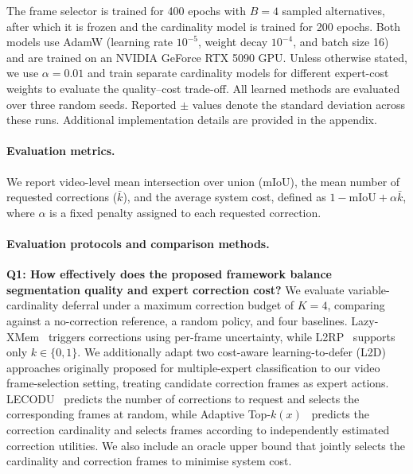 The frame selector is trained for 400 epochs with $B=4$ sampled
alternatives, after which it is frozen and the cardinality model
is trained for 200 epochs. Both models use AdamW (learning rate
$10^{-5}$, weight decay $10^{-4}$, and batch size 16) and are trained
on an NVIDIA GeForce RTX 5090 GPU.
Unless otherwise stated, we use $\alpha=0.01$ and train separate
cardinality models for different expert-cost weights to evaluate
the quality--cost trade-off.
All learned methods are evaluated over three random seeds.
Reported $\pm$ values denote the standard deviation across these runs.
Additional implementation details are provided in the appendix.



\paragraph{Evaluation metrics.}
We report video-level mean intersection over union (mIoU), the mean number of requested corrections ($\bar{k}$), and the average system cost, defined as $1-\mathrm{mIoU}+\alpha\bar{k}$, where $\alpha$ is a fixed
penalty assigned to each requested correction.



\paragraph{Evaluation protocols and comparison methods.}


\noindent\textbf{Q1: How effectively does the proposed framework
balance segmentation quality and expert correction cost?}
We evaluate variable-cardinality deferral under a maximum correction
budget of $K=4$, comparing against a no-correction reference,
a random policy, and four baselines.
Lazy-XMem~\cite{vujasinovic2024strike} triggers corrections
using per-frame uncertainty, while
L2RP~\cite{rasanjalee2026understanding} supports only
$k\in\{0,1\}$. We additionally adapt two cost-aware learning-to-defer (L2D)
approaches originally proposed for multiple-expert classification
to our video frame-selection setting, treating candidate correction
frames as expert actions. LECODU~\cite{zhang2024learning}
predicts the number of corrections to request and selects the
corresponding frames at random, while Adaptive Top-$k(x)$~
\cite{montreuil2025ask} predicts the correction cardinality
and selects frames according to independently estimated
correction utilities. We also include an oracle upper bound
that jointly selects the cardinality and correction frames
to minimise system cost.

